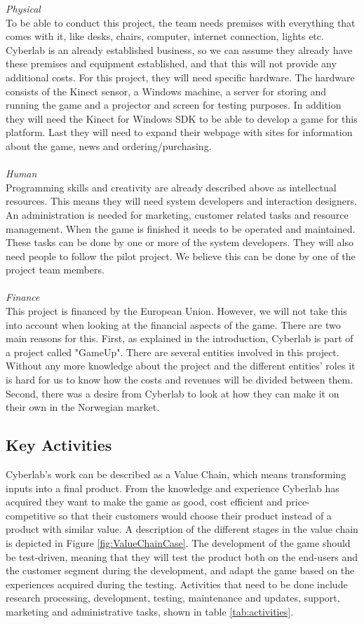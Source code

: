 \emph{Physical} \\ To be able to conduct this project, the team needs premises with everything that comes with it, like desks, chairs, computer, internet connection, lights etc. Cyberlab is an already established business, so we can assume they already have these premises and equipment established, and that this will not provide any additional costs. For this project, they will need specific hardware. The hardware consists of the Kinect sensor, a Windows machine, a server for storing and running the game and a projector and screen for testing purposes. In addition they will need the Kinect for Windows SDK to be able to develop a game for this platform. Last they will need to expand their webpage with sites for information about the game, news and ordering/purchasing. \\ \\
\emph{Human} \\ Programming skills and creativity are already described above as intellectual resources. This means they will need system developers and interaction designers. An administration is needed for marketing, customer related tasks and resource management. When the game is finished it needs to be operated and maintained. These tasks can be done by one or more of the system developers. They will also need people to follow the pilot project. We believe this can be done by one of the project team members. \\ \\
\emph{Finance} \\ This project is financed by the European Union. However, we will not take this into account when looking at the financial aspects of the game. There are two main reasons for this. First, as explained in the introduction, Cyberlab is part of a project called "GameUp". There are several entities involved in this project. Without any more knowledge about the project and the different entities' roles it is hard for us to know how the costs and revenues will be divided between them. Second, there was a desire from Cyberlab to look at how they can make it on their own in the Norwegian market. 

\subsection{Key Activities}
Cyberlab's work can be described as a Value Chain, which means transforming inputs into a final product. From the knowledge and experience Cyberlab has acquired they want to make the game as good, cost efficient and price-competitive so that their customers would choose their product instead of a product with similar value. A description of the different stages in the value chain is depicted in Figure \ref{fig:ValueChainCase}. The development of the game should be test-driven, meaning that they will test the product both on the end-users and the customer segment during the development, and adapt the game based on the experiences acquired during the testing. Activities that need to be done include research processing, development, testing, maintenance and updates, support, marketing and administrative tasks, shown in table \ref{tab:activities}. 

